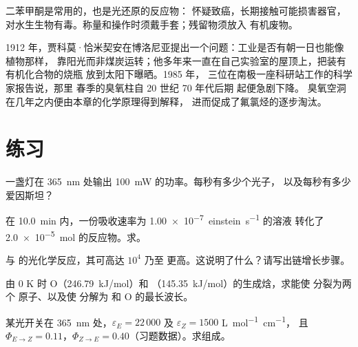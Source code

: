 \begin{safety}{}
二苯甲酮是常用的，也是光还原的反应物：
怀疑致癌，长期接触可能损害器官，
对水生生物有毒。称量和操作时须戴手套；残留物须放入
有机废物。
\end{safety}

\begin{history}[未来的光化学与天空中的空洞]
1912 年，贾科莫·恰米契安在博洛尼亚提出一个问题：工业是否有朝一日也能像植物那样，
靠阳光而非煤炭运转；他多年来一直在自己实验室的屋顶上，把装有有机化合物的烧瓶
放到太阳下曝晒。1985 年，
三位在南极一座科研站工作的科学家报告说，那里
春季的臭氧柱自 20 世纪 70 年代后期
起便急剧下降。
臭氧空洞在几年之内便由本章的化学原理得到解释，
进而促成了氟氯烃的逐步淘汰。
\end{history}

\section{练习}

\begin{exercise}[$\star$]\label{exo:b3:photochemistry:1}
一盏灯在 \qty{365}{nm} 处输出 \qty{100}{mW} 的功率。每秒有多少个光子，
以及每秒有多少爱因斯坦？
\end{exercise}

\begin{exercise}[$\star$]\label{exo:b3:photochemistry:2}
在 \qty{10.0}{min} 内，一份吸收速率为 \qty{1.00e-7}{einstein.s^{-1}} 的溶液
转化了 \qty{2.0e-5}{mol} 的反应物。求。
\end{exercise}

\begin{exercise}[$\star$]\label{exo:b3:photochemistry:3}
 与  的光化学反应，其可高达 $10^4$ 乃至
更高。这说明了什么？请写出链增长步骤。
\end{exercise}

\begin{exercise}[$\star$]\label{exo:b3:photochemistry:4}
由 0 K 时 O（\qty{246.79}{kJ/mol}）和 
（\qty{145.35}{kJ/mol}）的生成焓，求能使  分裂为两个
原子、以及使  分解为  和 O 的最长波长。
\end{exercise}

\begin{exercise}[$\star\star$]\label{exo:b3:photochemistry:5}
某光开关在 \qty{365}{nm} 处，$\varepsilon_E = 22\,000$ 及 $\varepsilon_Z = 1500$ \unit{L.mol^{-1}.cm^{-1}}，
且 $\Phi_{E\to Z} = 0.11$，$\Phi_{Z\to E} = 0.40$（习题数据）。求组成。
\end{exercise}

